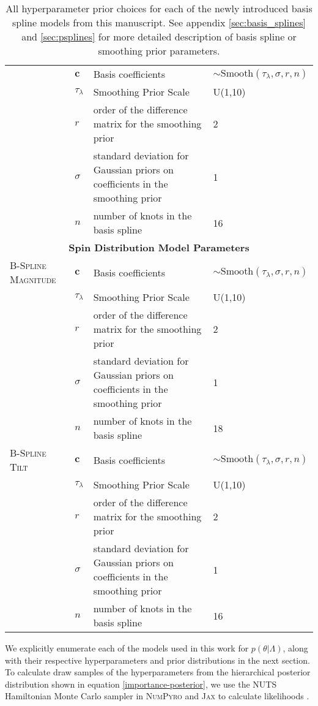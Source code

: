 \begin{table*}[hb!]
\begin{tabular}{|l|l|l|l|}
    & $\bm{c}$ & Basis coefficients & $\sim \mathrm{Smooth}(\tau_\lambda, \sigma, r, n)$ \\ \cline{2-4} 
     & $\tau_\lambda$ & Smoothing Prior Scale & U(1,10) \\ \cline{2-4}
     & $r$ & order of the difference matrix for the smoothing prior & 2 \\ \cline{2-4} 
     & $\sigma$ & standard deviation for Gaussian priors on coefficients in the smoothing prior & 1 \\ \cline{2-4} 
     & $n$ & number of knots in the basis spline & 16 \\ \hline \hline 
    \multicolumn{4}{|c|}{\textbf{Spin Distribution Model Parameters}} \\ \hline
    \textsc{B-Spline Magnitude} & $\bm{c}$ &  Basis coefficients & $\sim \mathrm{Smooth}(\tau_\lambda, \sigma, r, n)$  \\ \cline{2-4} 
    & $\tau_\lambda$ & Smoothing Prior Scale & U(1,10) \\ \cline{2-4}
    & $r$ & order of the difference matrix for the smoothing prior & 2 \\ \cline{2-4} 
    & $\sigma$ & standard deviation for Gaussian priors on coefficients in the smoothing prior & 1 \\ \cline{2-4} 
    & $n$ & number of knots in the basis spline & 18 \\ \hline \hline 
    \textsc{B-Spline Tilt} & $\bm{c}$ &  Basis coefficients & $\sim \mathrm{Smooth}(\tau_\lambda, \sigma, r, n)$  \\ \cline{2-4} 
    & $\tau_\lambda$ & Smoothing Prior Scale & U(1,10) \\ \cline{2-4}
    & $r$ & order of the difference matrix for the smoothing prior & 2 \\ \cline{2-4} 
    & $\sigma$ & standard deviation for Gaussian priors on coefficients in the smoothing prior & 1 \\ \cline{2-4} 
    & $n$ & number of knots in the basis spline & 16 \\ \hline \hline
    \end{tabular}
    \caption{All hyperparameter prior choices for each of the newly introduced basis spline models from this manuscript. See appendix 
    \ref{sec:basis_splines} and \ref{sec:psplines} for more detailed description of basis spline or smoothing prior parameters.}
    \label{tab:model_priors}
\end{table*} 


We explicitly enumerate each of the models used in this work for $p(\theta|\Lambda)$, along with 
their respective hyperparameters and prior distributions in the next section. To calculate draw 
samples of the hyperparameters from the hierarchical posterior distribution shown in equation \ref{importance-posterior}, we use the 
NUTS Hamiltonian Monte Carlo sampler in \textsc{NumPyro} and \textsc{Jax} to calculate likelihoods \citep{jax,pyro,numpyro}.

